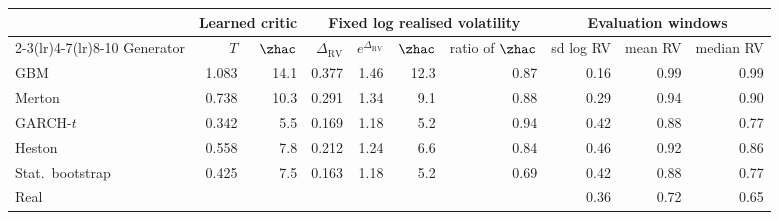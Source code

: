 \begin{tabular}{lrrrrrrrrr}
\toprule
 & \multicolumn{2}{c}{Learned critic} & \multicolumn{4}{c}{Fixed log realised volatility} & \multicolumn{3}{c}{Evaluation windows} \\
\cmidrule(lr){2-3}\cmidrule(lr){4-7}\cmidrule(lr){8-10}
Generator & $T$ & $\zhac$ & $\Delta_{\mathrm{RV}}$ & $e^{\Delta_{\mathrm{RV}}}$ & $\zhac$ & ratio of $\zhac$ & sd log RV & mean RV & median RV \\
\midrule
GBM & 1.083 & 14.1 & 0.377 & 1.46 & 12.3 & 0.87 & 0.16 & 0.99 & 0.99 \\
Merton & 0.738 & 10.3 & 0.291 & 1.34 & 9.1 & 0.88 & 0.29 & 0.94 & 0.90 \\
GARCH-$t$ & 0.342 & 5.5 & 0.169 & 1.18 & 5.2 & 0.94 & 0.42 & 0.88 & 0.77 \\
Heston & 0.558 & 7.8 & 0.212 & 1.24 & 6.6 & 0.84 & 0.46 & 0.92 & 0.86 \\
Stat.\ bootstrap & 0.425 & 7.5 & 0.163 & 1.18 & 5.2 & 0.69 & 0.42 & 0.88 & 0.77 \\
\midrule
Real \TEST{} & & & & & & & 0.36 & 0.72 & 0.65 \\
\bottomrule
\end{tabular}
